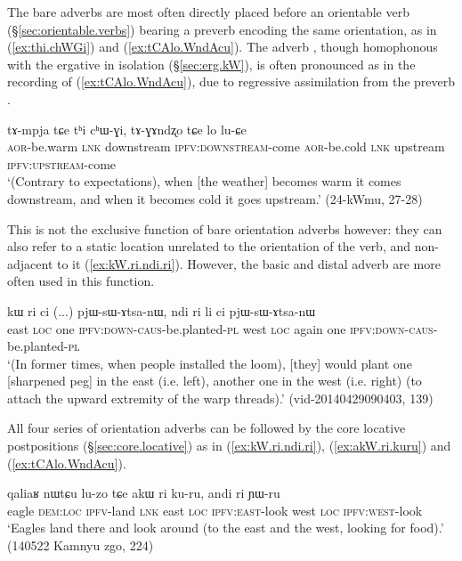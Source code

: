 The bare adverbs are most often directly placed before an orientable verb (§\ref{sec:orientable.verbs}) bearing a preverb encoding the same orientation, as in (\ref{ex:thi.chWGi}) and (\ref{ex:tCAlo.WndAcu}). The adverb , though homophonous with the ergative in isolation (§\ref{sec:erg.kW}), is often pronounced  as in the recording of (\ref{ex:tCAlo.WndAcu}), due to regressive assimilation from the preverb .

 \begin{exe}
\ex \label{ex:thi.chWGi}
\gll tɤ-mpja tɕe tʰi cʰɯ-ɣi, tɤ-ɣɤndʐo tɕe lo lu-ɕe \\
\textsc{aor}-be.warm \textsc{lnk} downstream \textsc{ipfv}:\textsc{downstream}-come \textsc{aor}-be.cold  \textsc{lnk} upstream \textsc{ipfv}:\textsc{upstream}-come \\
\glt `(Contrary to expectations), when [the weather] becomes warm it comes downstream, and when it becomes cold it goes upstream.' (24-kWmu, 27-28)
 \end{exe}

This is not the exclusive function of bare orientation adverbs however: they can also refer to a static location unrelated to the orientation of the verb, and non-adjacent to it (\ref{ex:kW.ri.ndi.ri}). However, the basic and distal adverb are more often used in this function.

\begin{exe}
\ex \label{ex:kW.ri.ndi.ri}
\gll kɯ ri ci (...) pjɯ-sɯ-ɤtsa-nɯ, ndi ri li ci pjɯ-sɯ-ɤtsa-nɯ   \\
east \textsc{loc} one {  } \textsc{ipfv}:\textsc{down}-\textsc{caus}-be.planted-\textsc{pl} 
west \textsc{loc} again one \textsc{ipfv}:\textsc{down}-\textsc{caus}-be.planted-\textsc{pl}  \\
\glt `(In former times, when people installed the loom), [they] would plant one [sharpened peg] in the east (i.e. left), another one in the west (i.e. right) (to attach the upward extremity of the warp threads).' (vid-20140429090403, 139)
 \end{exe}
 
All four series of orientation adverbs can be followed by the core locative postpositions (§\ref{sec:core.locative}) as in (\ref{ex:kW.ri.ndi.ri}), (\ref{ex:akW.ri.kuru}) and (\ref{ex:tCAlo.WndAcu}).

 \begin{exe}
\ex \label{ex:akW.ri.kuru}
\gll qaliaʁ nɯtɕu lu-zo tɕe akɯ ri ku-ru, andi ri ɲɯ-ru   \\
eagle \textsc{dem}:\textsc{loc} \textsc{ipfv}-land \textsc{lnk} east \textsc{loc} \textsc{ipfv}:\textsc{east}-look west \textsc{loc} \textsc{ipfv}:\textsc{west}-look \\
\glt `Eagles land there and look around (to the east and the west, looking for food).' (140522 Kamnyu zgo, 224)
 \end{exe}
 
